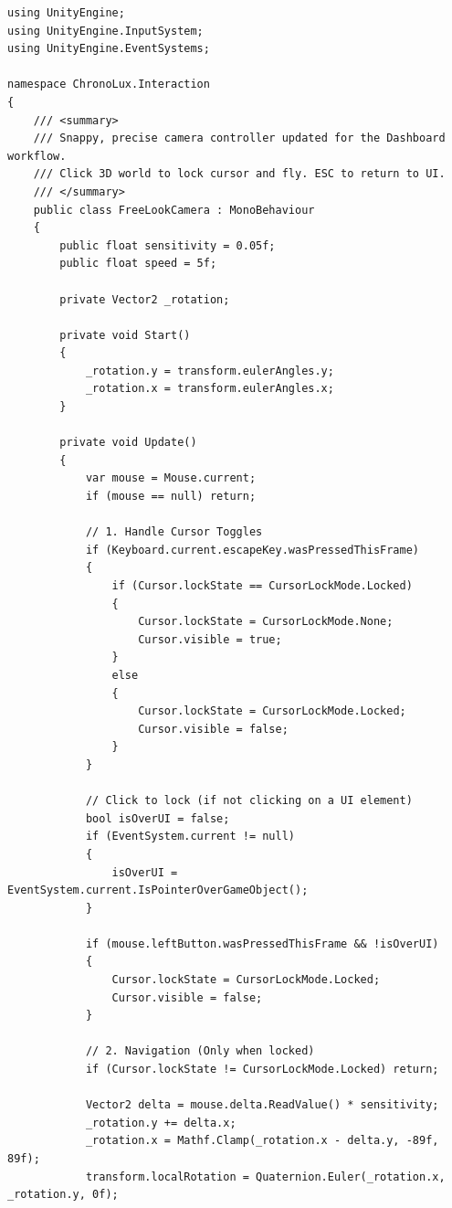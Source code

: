\begin{lstlisting}[language={[Sharp]C}, caption={FreeLookCamera.cs: Handles the free-look navigation within the simulated laboratory environment.}, label={lst:freelookcamera}]
using UnityEngine;
using UnityEngine.InputSystem;
using UnityEngine.EventSystems;

namespace ChronoLux.Interaction
{
    /// <summary>
    /// Snappy, precise camera controller updated for the Dashboard workflow.
    /// Click 3D world to lock cursor and fly. ESC to return to UI.
    /// </summary>
    public class FreeLookCamera : MonoBehaviour
    {
        public float sensitivity = 0.05f;
        public float speed = 5f;

        private Vector2 _rotation;

        private void Start()
        {
            _rotation.y = transform.eulerAngles.y;
            _rotation.x = transform.eulerAngles.x;
        }

        private void Update()
        {
            var mouse = Mouse.current;
            if (mouse == null) return;

            // 1. Handle Cursor Toggles
            if (Keyboard.current.escapeKey.wasPressedThisFrame)
            {
                if (Cursor.lockState == CursorLockMode.Locked)
                {
                    Cursor.lockState = CursorLockMode.None;
                    Cursor.visible = true;
                }
                else
                {
                    Cursor.lockState = CursorLockMode.Locked;
                    Cursor.visible = false;
                }
            }

            // Click to lock (if not clicking on a UI element)
            bool isOverUI = false;
            if (EventSystem.current != null)
            {
                isOverUI = EventSystem.current.IsPointerOverGameObject();
            }

            if (mouse.leftButton.wasPressedThisFrame && !isOverUI)
            {
                Cursor.lockState = CursorLockMode.Locked;
                Cursor.visible = false;
            }

            // 2. Navigation (Only when locked)
            if (Cursor.lockState != CursorLockMode.Locked) return;

            Vector2 delta = mouse.delta.ReadValue() * sensitivity;
            _rotation.y += delta.x;
            _rotation.x = Mathf.Clamp(_rotation.x - delta.y, -89f, 89f);
            transform.localRotation = Quaternion.Euler(_rotation.x, _rotation.y, 0f);


\end{lstlisting}
